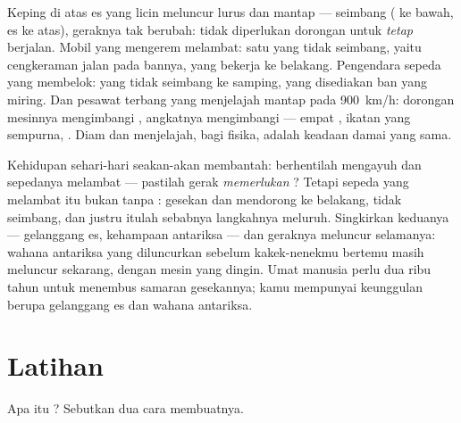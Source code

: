 \begin{example}\label{ex:g9:uniform-varied-motion:reading}
Keping di atas es yang licin meluncur lurus dan mantap --- 
seimbang ( ke bawah, es ke atas), geraknya tak berubah: tidak
diperlukan dorongan untuk \emph{tetap} berjalan. Mobil yang mengerem
melambat: satu  yang tidak seimbang, yaitu cengkeraman jalan pada
bannya, yang bekerja ke belakang. Pengendara sepeda yang membelok: 
yang tidak seimbang ke samping, yang disediakan ban yang miring. Dan
pesawat terbang yang menjelajah mantap pada \qty{900}{km/h}: dorongan
mesinnya mengimbangi  ,  angkatnya mengimbangi
 --- empat , ikatan yang sempurna, . Diam
dan menjelajah, bagi fisika, adalah keadaan damai yang sama.
\end{example}

\begin{remark}\label{rem:g9:uniform-varied-motion:surprise}
Kehidupan sehari-hari seakan-akan membantah: berhentilah mengayuh dan
sepedanya melambat --- pastilah gerak \emph{memerlukan} ? Tetapi
sepeda yang melambat itu bukan tanpa : gesekan dan  mendorong
ke belakang, tidak seimbang, dan justru itulah sebabnya langkahnya
meluruh. Singkirkan keduanya --- gelanggang es, kehampaan antariksa ---
dan geraknya meluncur selamanya: wahana antariksa yang diluncurkan
sebelum kakek-nenekmu bertemu masih meluncur sekarang, dengan mesin
yang dingin. Umat manusia perlu dua ribu tahun untuk menembus samaran
gesekannya; kamu mempunyai keunggulan berupa gelanggang es dan wahana
antariksa.
\end{remark}

\section{Latihan}

\begin{exercise}[$\star$]\label{exo:g9:uniform-varied-motion:1}
Apa itu ? Sebutkan dua cara
membuatnya.
\end{exercise}

